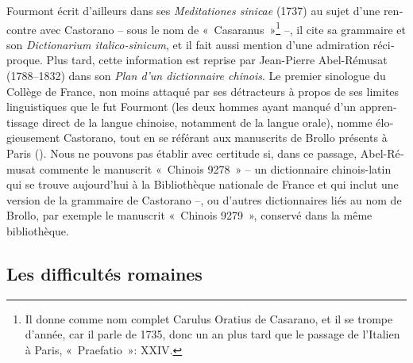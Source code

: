 \documentclass[output=paper,colorlinks,citecolor=brown,arabicfont,chinesefont,booklanguage=french]{langscibook}
\begin{document}
\begin{otherlanguage}{french}
\largerpage
Fourmont écrit d’ailleurs dans ses \emph{Meditationes sinicae} (1737) au sujet d’une rencontre avec Castorano – sous le nom de «~Casaranus~»\footnote{Il donne comme nom complet Carulus Oratius de Casarano, et il se trompe d’année, car il parle de 1735, donc un an plus tard que le passage de l’Italien à Paris, «~Praefatio~»: XXIV.} –, il cite sa grammaire et son \emph{Dictionarium italico-sinicum}, et il fait aussi mention d’une admiration réciproque. Plus tard, cette information est reprise par Jean-Pierre Abel-Rémusat (1788--1832) dans son \emph{Plan d’un dictionnaire chinois}. Le premier sinologue du Collège de France, non moins attaqué par ses détracteurs à propos de ses limites linguistiques que le fut Fourmont (les deux hommes ayant manqué d’un apprentissage direct de la langue chinoise, notamment de la langue orale), nomme élogieusement Castorano, tout en se référant aux manuscrits de Brollo présents à Paris (\citealt[9--12]{Abel-remusat1814}). Nous ne pouvons pas établir avec certitude si, dans ce passage, Abel-Rémusat commente le manuscrit «~Chinois 9278~» – un dictionnaire chinois-latin qui se trouve aujourd’hui à la Bibliothèque nationale de France et qui inclut une version de la grammaire de Castorano –, ou d’autres dictionnaires liés au nom de Brollo, par exemple le manuscrit «~Chinois 9279~», conservé dans la même bibliothèque.

\largerpage
\subsection{Les difficultés romaines}


\end{otherlanguage}
\end{document}
